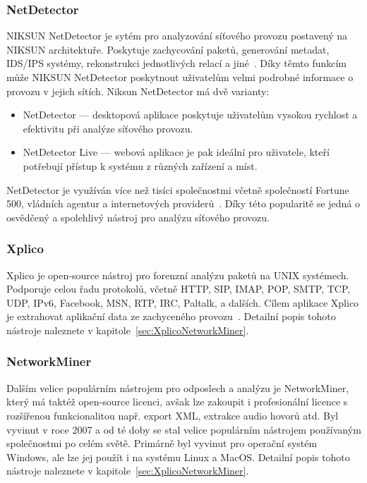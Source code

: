        \subsubsection*{NetDetector}
            NIKSUN NetDetector je sytém pro analyzování síťového provozu postavený na NIKSUN architektuře. Poskytuje zachycování paketů, generování metadat, \gls{IDS}/\gls{IPS} systémy, rekonstrukci jednotlivých relací a jiné~\cite{NiksunNetDetectorReference}. Díky těmto funkcím může NIKSUN NetDetector poskytnout uživatelům velmi podrobné informace o provozu v jejich sítích. Niksun NetDetector má dvě varianty:
            \begin{itemize}
                \item NetDetector --- desktopová aplikace poskytuje uživatelům vysokou rychlost a efektivitu při analýze síťového provozu. 
                \item NetDetector Live --- webová aplikace je pak ideální pro uživatele, kteří potřebují přístup k systému z různých zařízení a míst.
            \end{itemize}
            
            NetDetector je využíván více než tisíci společnostmi včetně společností Fortune 500, vládních agentur a internetových providerů~\cite{NiksunNetDetectorIBMReference}. Díky této popularitě se jedná o osvědčený a spolehlivý nástroj pro analýzu síťového provozu.
    
        \subsubsection*{Xplico}
            Xplico je open-source nástroj pro forenzní analýzu paketů na UNIX systémech. Podporuje celou řadu protokolů, včetně \gls{HTTP}, \gls{SIP}, \gls{IMAP}, \gls{POP}, \gls{SMTP}, \gls{TCP}, \gls{UDP}, IPv6, Facebook, \gls{MSN}, \gls{RTP}, \gls{IRC}, Paltalk, a dalších.
            Cílem aplikace Xplico je extrahovat aplikační data ze zachyceného provozu~\cite{XplicoReference}. Detailní popis tohoto nástroje naleznete v kapitole~\ref{sec:XplicoNetworkMiner}.
                   
        \subsubsection*{NetworkMiner}
            Dalším velice populárním nástrojem pro odposlech a analýzu je NetworkMiner, který má taktéž open-source licenci, avšak lze zakoupit i profesionální licence s rozšířenou funkcionalitou např. export \gls{XML}, extrakce audio hovorů atd. Byl vyvinut v roce 2007 a od té doby se stal velice populárním nástrojem používaným společnostmi po celém světě. Primárně byl vyvinut pro operační systém Windows, ale lze jej použít i na systému Linux a MacOS. Detailní popis tohoto nástroje naleznete v kapitole~\ref{sec:XplicoNetworkMiner}.

